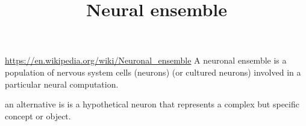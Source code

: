 \documentclass[a4paper]{article}
\title{Neural ensemble}
\date{}
\begin{document}
    \maketitle
    
    \url{https://en.wikipedia.org/wiki/Neuronal_ensemble}
    A neuronal ensemble is a population of nervous system cells (neurons) (or cultured neurons) involved in a particular neural computation.
    
    an alternative is   is a hypothetical neuron that represents a complex but specific concept or object.
    
    
\end{document}
